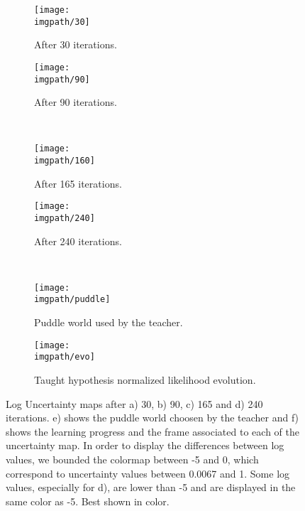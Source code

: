 \begin{figure}[!htbp]
  \centering
      \begin{subfigure}[b]{0.35\columnwidth}
          \centering
          \texttt{[image: \\imgpath/30]}
          \caption{After 30 iterations.}
          \label{fig:30}
      \end{subfigure}
      \begin{subfigure}[b]{0.35\columnwidth}
          \centering
          \texttt{[image: \\imgpath/90]}
          \caption{After 90 iterations.}
          \label{fig:90}
      \end{subfigure}\\
      \begin{subfigure}[b]{0.35\columnwidth}
          \centering
          \texttt{[image: \\imgpath/160]}
          \caption{After 165 iterations.}
          \label{fig:165}
      \end{subfigure}
      \begin{subfigure}[b]{0.35\columnwidth}
          \centering
          \texttt{[image: \\imgpath/240]}
          \caption{After 240 iterations.}
          \label{fig:240}
      \end{subfigure}\\
      \begin{subfigure}[b]{0.25\columnwidth}
          \centering
          \texttt{[image: \\imgpath/puddle]}     
          \caption{Puddle world used by the teacher.}
          \label{fig:puddle}
      \end{subfigure}
      \begin{subfigure}[t]{0.45\columnwidth}
          \centering
          \texttt{[image: \\imgpath/evo]}
          \caption{Taught hypothesis normalized likelihood evolution.}
          \label{fig:evo}
      \end{subfigure}
        
  \caption{Log Uncertainty maps after a) 30, b) 90, c) 165 and d) 240 iterations. e) shows the puddle world choosen by the teacher and f) shows the learning progress and the frame associated to each of the uncertainty map. In order to display the differences between log values, we bounded the colormap between -5 and 0, which correspond to uncertainty values between 0.0067 and 1. Some log values, especially for d), are lower than -5 and are displayed in the same color as -5. Best shown in color.}
  \label{UncertaintyMap}
\end{figure}

